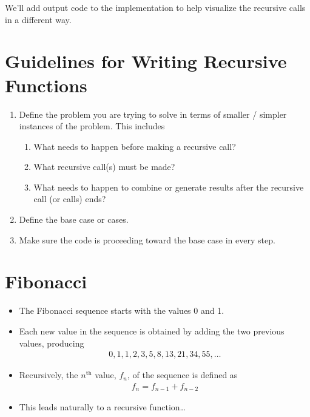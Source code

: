 \documentclass[letterpaper,10pt,english]{sphinxmanual}
\begin{document}
We’ll add output code to the implementation to help visualize the
recursive calls in a different way.


\section{Guidelines for Writing Recursive Functions}
\label{\detokenize{lecture_notes/lec23_recursion:guidelines-for-writing-recursive-functions}}\begin{enumerate}
\item {} 
Define the problem you are trying to solve in terms of smaller /
simpler instances of the problem. This includes
\begin{enumerate}
\item {} 
What needs to happen before making a recursive call?

\item {} 
What recursive call(s) must be made?

\item {} 
What needs to happen to combine or generate results after the
recursive call (or calls) ends?

\end{enumerate}

\item {} 
Define the base case or cases.

\item {} 
Make sure the code is proceeding toward the base case in every step.

\end{enumerate}


\section{Fibonacci}
\label{\detokenize{lecture_notes/lec23_recursion:fibonacci}}\begin{itemize}
\item {} 
The Fibonacci sequence starts with the values 0 and 1.

\item {} 
Each new value in the sequence is obtained by adding the two previous
values, producing
\begin{equation*}
\begin{split}0, 1, 1, 2, 3, 5, 8, 13, 21, 34, 55, \ldots\end{split}
\end{equation*}
\item {} 
Recursively, the \(n^\text{th}\) value, \(f_n\), of the
sequence is defined as
\begin{equation*}
\begin{split}f_n = f_{n-1} + f_{n-2}\end{split}
\end{equation*}
\item {} 
This leads naturally to a recursive function…

\end{itemize}
\end{document}
